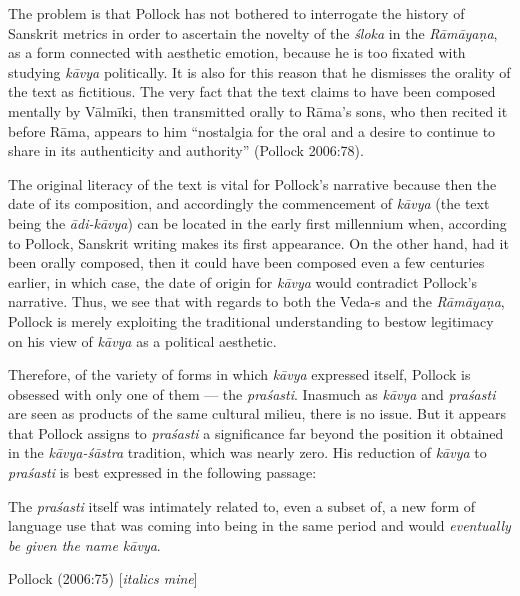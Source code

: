 The problem is that Pollock has not bothered to interrogate the history of Sanskrit metrics in order to ascertain the novelty of the \textsl{śloka} in the \textsl{Rāmāyaṇa}, as a form connected with aesthetic emotion, because he is too fixated with studying \textsl{kāvya} politically. It is also for this reason that he dismisses the orality of the text as fictitious. The very fact that the text claims to have been composed mentally by Vālmīki, then transmitted orally to Rāma's sons, who then recited it before Rāma, appears to him ``nostalgia for the oral and a desire to continue to share in its authenticity and authority'' (Pollock 2006:78). 

The original literacy of the text is vital for Pollock's narrative because then the date of its composition, and accordingly the commencement of \textsl{kāvya} (the text being the \textsl{ādi-kāvya}) can be located in the early first millennium when, according to Pollock, Sanskrit writing makes its first appearance. On the other hand, had it been orally composed, then it could have been composed even a few centuries earlier, in which case, the date of origin for \textsl{kāvya} would contradict Pollock's narrative. Thus, we see that with regards to both the Veda-s and the \textsl{Rāmāyaṇa}, Pollock is merely exploiting the traditional understanding to bestow legitimacy on his view of \textsl{kāvya} as a political aesthetic.

Therefore, of the variety of forms in which \textsl{kāvya} expressed itself, Pollock is obsessed with only one of them --- the \textsl{praśasti}. Inasmuch as \textsl{kāvya} and \textsl{praśasti} are seen as products of the same cultural milieu, there is no issue. But it appears that Pollock assigns to \textsl{praśasti} a significance far beyond the position it obtained in the \textsl{kāvya-śāstra} tradition, which was nearly zero. His reduction of \textsl{kāvya} to \textsl{praśasti} is best expressed in the following passage:

\begin{myquote}
The \textsl{praśasti} itself was intimately related to, even a subset of, a new form of language use that was coming into being in the same period and would \textsl{eventually be given the name kāvya}. 

\hfill Pollock (2006:75) [\textsl{italics mine}]
\end{myquote}

